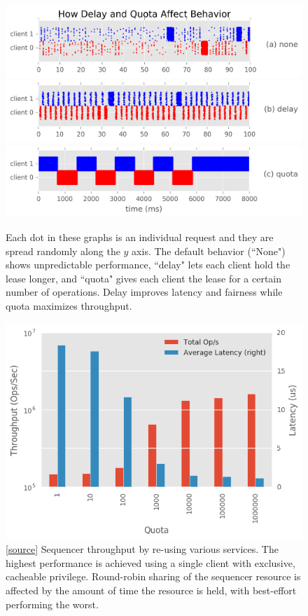 \documentclass[preprint]{sigplanconf-eurosys}
\begin{document}
\begin{figure}[h]
\centering
\includegraphics{figures/capdelay-quota-behavior-a.png}
\includegraphics{figures/capdelay-quota-behavior-b.png}
\includegraphics{figures/capdelay-quota-behavior-c.png}
\caption{ Each dot in these graphs is an individual request and they are spread
randomly along the \(y\) axis. The default behavior (``None") shows
unpredictable performance, ``delay" lets each client hold the lease longer, and
``quota" gives each client the lease for a certain number of operations. Delay
improves latency and fairness while quota maximizes throughput.}
\label{fig:capdelay-quota-behavior}
\end{figure}

\begin{figure}[h]
\centering
\includegraphics{figures/tradeoff.png}
\caption{[\href{https://github.com/double-blind-submitter/osdi16}{source}]
Sequencer throughput by re-using various services.  The highest performance is
achieved using a single client with exclusive, cacheable privilege. Round-robin
sharing of the sequencer resource is affected by the amount of time the
resource is held, with best-effort performing the worst.}
\label{fig:captp}
\end{figure}
\end{document}
